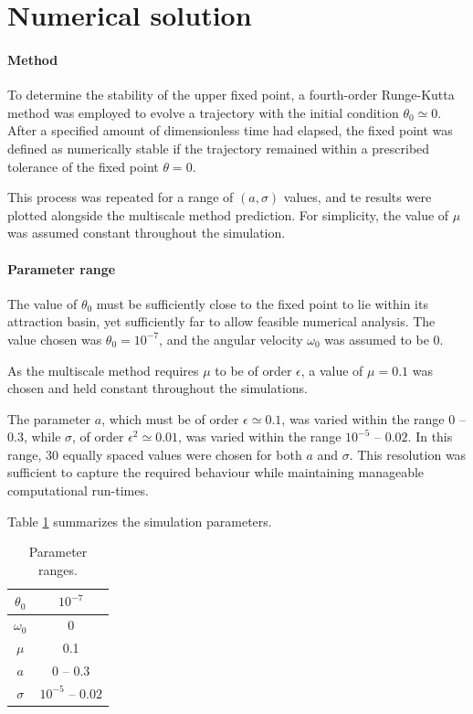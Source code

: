 \section{Numerical solution}

\paragraph{Method}
To determine the stability of the upper fixed point, a fourth-order Runge-Kutta method was employed to evolve a trajectory with the initial condition $\theta_0 \simeq 0$. After a specified amount of dimensionless time had elapsed, the fixed point was defined as numerically stable if the trajectory remained within a prescribed tolerance of the fixed point $\theta = 0$. 

This process was repeated for a range of $(a, \sigma)$ values, and te results were plotted alongside the multiscale method prediction. For simplicity, the value of $\mu$ was assumed constant throughout the simulation.

\paragraph{Parameter range}
The value of $\theta_0$ must be sufficiently close to the fixed point to lie within its attraction basin, yet sufficiently far to allow feasible numerical analysis. The value chosen was $\theta_0 = 10^{-7}$, and the angular velocity $\omega_0$ was assumed to be 0.

As the multiscale method requires $\mu$ to be of order $\epsilon$, a value of $\mu = 0.1$ was chosen and held constant throughout the simulations.

The parameter $a$, which must be of order $\epsilon \simeq 0.1$, was varied within the range $0$ -- $0.3$, while $\sigma$, of order $\epsilon^2 \simeq 0.01$, was varied within the range $10^{-5}$ -- $0.02$. In this range, 30 equally spaced values were chosen for both $a$ and $\sigma$. This resolution was sufficient to capture the required behaviour while maintaining manageable computational run-times.

Table \ref{tab:params} summarizes the simulation parameters.

\begin{table}[h]
    \centering
    \begin{tabular}{|c|c|} \hline 
        $\theta_0$ & $10^{-7}$ \\ \hline 
        $\omega_0$ & 0 \\ \hline 
         $\mu$&  0.1\\ \hline
         $a$&  $0$ -- $0.3$\\ \hline
         $\sigma$&  $10^{-5}$ -- $0.02$\\ \hline
    \end{tabular}
    \caption{Parameter ranges.}
    \label{tab:params}
\end{table}


